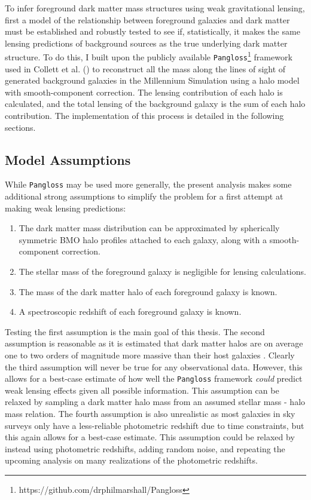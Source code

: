 \documentclass[%
 reprint,
 amsmath,amssymb,
 aps,nofootinbib
]{revtex4-1}
\begin{document}
To infer foreground dark matter mass structures using weak gravitational lensing, first a model of the relationship between foreground galaxies and dark matter must be established and robustly tested to see if, statistically, it makes the same lensing predictions of background sources as the true underlying dark matter structure. To do this, I built upon the publicly available \texttt{Pangloss}\footnote{\label{note1}https://github.com/drphilmarshall/Pangloss} framework used in Collett et al. (\cite{collett}) to reconstruct all the
mass along the lines of sight of generated background galaxies in the Millennium Simulation using a halo model with smooth-component correction. The lensing contribution of each halo is calculated, and the total lensing of the background galaxy is the sum of each halo contribution. The implementation of this process is detailed in the following sections.


\subsection{Model Assumptions} \label{assumptions}
While \texttt{Pangloss} may be used more generally, the present analysis makes some additional strong assumptions to simplify the problem for a first attempt at making weak lensing predictions:

\begin{enumerate}
\item The dark matter mass distribution can be approximated by spherically symmetric BMO halo profiles attached to each galaxy, along with a smooth-component correction.
\item The stellar mass of the foreground galaxy is negligible for lensing calculations.
\item The mass of the dark matter halo of each foreground galaxy is known.
\item A spectroscopic redshift of each foreground galaxy is known.
\end{enumerate}

Testing the first assumption is the main goal of this thesis. The second assumption is reasonable as it is estimated that dark matter halos are on average one to two orders of magnitude more massive than their host galaxies \cite{smhr}. Clearly the third assumption will never be true for any observational data. However, this allows for a best-case estimate of how well the \texttt{Pangloss} framework \textit{could} predict weak lensing effects given all possible information. This assumption can be relaxed by sampling a dark matter halo mass from an assumed stellar mass - halo mass relation. The fourth assumption is also unrealistic as most galaxies in sky surveys only have a less-reliable photometric redshift due to time constraints, but this again allows for a best-case estimate. This assumption could be relaxed by instead using photometric redshifts, adding random noise, and repeating the upcoming analysis on many realizations of the photometric redshifts.
\end{document}
